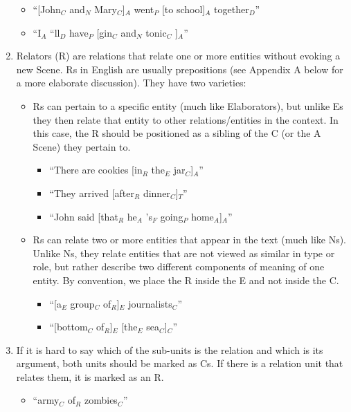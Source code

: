 \documentclass[11pt]{article}
\begin{document}
\begin{enumerate}
\begin{itemize}
\item
``[John$_C$ and$_N$ Mary$_C$]$_A$ went$_P$ [to school]$_A$ together$_D$''
\item
``I$_A$ ``ll$_D$ have$_P$ [gin$_C$ and$_N$ tonic$_C$ ]$_A$''
\end{itemize}

\item
Relators (R) are relations that relate one or more entities without evoking a new Scene. Rs in English are usually prepositions (see Appendix A below for a more elaborate discussion). They have two varieties:

\begin{itemize}
\item
Rs can pertain to a specific entity (much like Elaborators), but unlike Es they then relate that entity to other relations/entities in the context. In this case, the R should be positioned as a sibling of the C (or the A Scene) they pertain to.

\begin{itemize}
\item
``There are cookies [in$_R$ the$_E$ jar$_C$]$_A$''
\item
``They arrived [after$_R$ dinner$_C$]$_T$''
\item
``John said [that$_R$ he$_A$ 's$_F$ going$_P$ home$_A$]$_A$''
\end{itemize}

\item
Rs can relate two or more entities that appear in the text (much like Ns). Unlike Ns, they relate entities that are not viewed as similar in type or role, but rather describe two different components of meaning of one entity. By convention, we place the R inside the E and not inside the C.
\begin{itemize}
\item ``[a$_E$ group$_C$ of$_R$]$_E$ journalists$_C$''
\item ``[bottom$_C$ of$_R$]$_E$ [the$_E$ sea$_C$]$_C$''
\end{itemize}

\end{itemize}

\item
If it is hard to say which of the sub-units is the relation and which is its argument, both units should be marked as Cs. If there is a relation unit that relates them, it is marked as an R.
\begin{itemize}
\item
``army$_C$ of$_R$ zombies$_C$''
\end{itemize}


\end{enumerate}
\end{document}
